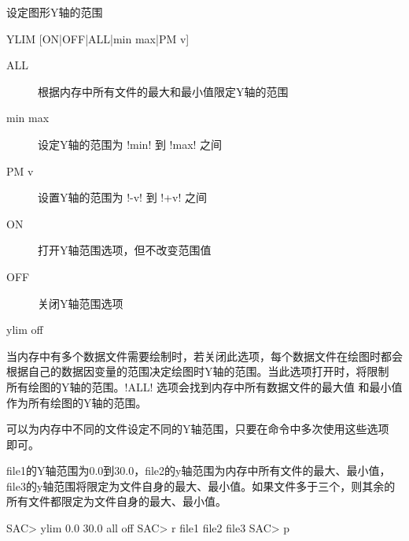 \label{cmd:ylim}

设定图形Y轴的范围

\begin{SACSTX}
YLIM [ON|OFF|ALL|min max|PM v]
\end{SACSTX}

\begin{description}
\item [ALL] 根据内存中所有文件的最大和最小值限定Y轴的范围
\item [min max] 设定Y轴的范围为 !min! 到 !max! 之间
\item [PM v] 设置Y轴的范围为 !-v! 到 !+v! 之间
\item [ON] 打开Y轴范围选项，但不改变范围值
\item [OFF] 关闭Y轴范围选项
\end{description}

\begin{SACDFT}
ylim off
\end{SACDFT}

当内存中有多个数据文件需要绘制时，若关闭此选项，每个数据文件在绘图时都会
根据自己的数据因变量的范围决定绘图时Y轴的范围。当此选项打开时，将限制
所有绘图的Y轴的范围。!ALL! 选项会找到内存中所有数据文件的最大值
和最小值作为所有绘图的Y轴的范围。

可以为内存中不同的文件设定不同的Y轴范围，只要在命令中多次使用这些选项
即可。

file1的Y轴范围为0.0到30.0，file2的y轴范围为内存中所有文件的最大、最小值，
file3的y轴范围将限定为文件自身的最大、最小值。如果文件多于三个，则其余的
所有文件都限定为文件自身的最大、最小值。
\begin{SACCode}
SAC> ylim 0.0 30.0 all off
SAC> r file1 file2 file3
SAC> p
\end{SACCode}
